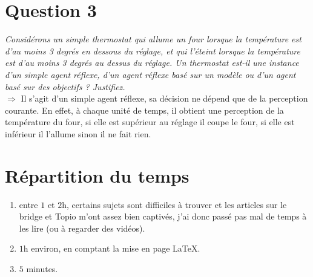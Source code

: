 \documentclass{article}
\newcommand{\term}[1]{\textit{\textcolor{maintitle}{#1}}}
\begin{document}
\begin{sffamily}
\section{Question 3}

\term{Considérons un simple thermostat qui allume un four lorsque la température est d'au moins 3 degrés en dessous 
du réglage, et qui l'éteint lorsque la température est d'au moins 3 degrés au dessus du réglage. Un thermostat est-il 
une instance d'un simple agent réflexe, d'un agent réflexe basé sur un modèle ou d'un agent basé sur des objectifs ? 
Justifiez.} \\

$\Rightarrow$ Il s'agit d'un simple agent réflexe, sa décision ne dépend que de la perception courante. En effet, à chaque 
unité de temps, il obtient une perception de la température du four, si elle est supérieur au réglage il coupe le four, si elle 
est inférieur il l'allume sinon il ne fait rien.

\section{Répartition du temps}

\begin{enumerate}
\item entre $1$ et $2$h, certains sujets sont difficiles à trouver et les articles sur le bridge et Topio m'ont assez bien 
captivés, j'ai donc passé pas mal de temps à les lire (ou à regarder des vidéos).
\item $1$h environ, en comptant la mise en page LaTeX.
\item $5$ minutes.
\end{enumerate}

\end{sffamily}
\end{document}
